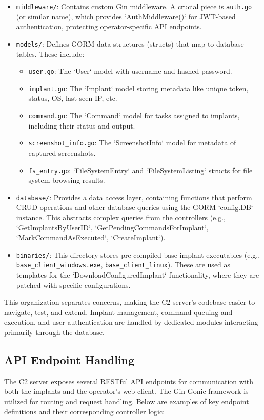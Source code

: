 \begin{itemize}
\begin{itemize}
        \end{itemize}
    \item \texttt{middleware/}: Contains custom Gin middleware. A crucial piece is \texttt{auth.go} (or similar name), which provides `AuthMiddleware()` for JWT-based authentication, protecting operator-specific API endpoints.
    \item \texttt{models/}: Defines GORM data structures (structs) that map to database tables. These include:
        \begin{itemize}
            \item \texttt{user.go}: The `User` model with username and hashed password.
            \item \texttt{implant.go}: The `Implant` model storing metadata like unique token, status, OS, last seen IP, etc.
            \item \texttt{command.go}: The `Command` model for tasks assigned to implants, including their status and output.
            \item \texttt{screenshot\_info.go}: The `ScreenshotInfo` model for metadata of captured screenshots.
            \item \texttt{fs\_entry.go}: `FileSystemEntry` and `FileSystemListing` structs for file system browsing results.
        \end{itemize}
    \item \texttt{database/}: Provides a data access layer, containing functions that perform CRUD operations and other database queries using the GORM `config.DB` instance. This abstracts complex queries from the controllers (e.g., `GetImplantsByUserID`, `GetPendingCommandsForImplant`, `MarkCommandAsExecuted`, `CreateImplant`).
    \item \texttt{binaries/}: This directory stores pre-compiled base implant executables (e.g., \texttt{base\_client\_windows.exe}, \texttt{base\_client\_linux}). These are used as templates for the `DownloadConfiguredImplant` functionality, where they are patched with specific configurations.
\end{itemize}
This organization separates concerns, making the C2 server's codebase easier to navigate, test, and extend. Implant management, command queuing and execution, and user authentication are handled by dedicated modules interacting primarily through the database.

\subsection{API Endpoint Handling}
The C2 server exposes several RESTful API endpoints for communication with both the implants and the operator's web client. The Gin Gonic framework is utilized for routing and request handling. Below are examples of key endpoint definitions and their corresponding controller logic:

